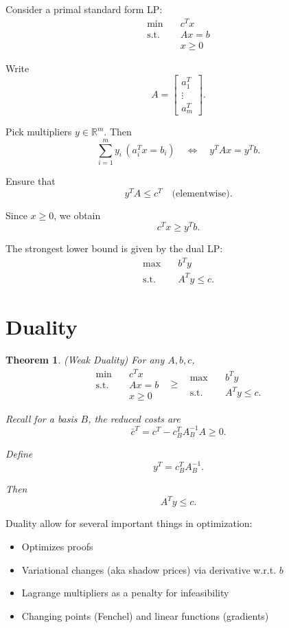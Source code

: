 \documentclass[12pt,oneside]{book}
\numberwithin{equation}{section}
\theoremstyle{definition}
\theoremstyle{plain}
\newtheorem{theorem}{Theorem}[section]
\theoremstyle{remark}
\begin{document}
Consider a primal standard form LP:
\[
\begin{aligned}
\min \quad & c^T x \\
\text{s.t.} \quad & Ax = b \\
& x \ge 0
\end{aligned}
\]

Write
\[
A =
\begin{bmatrix}
a_1^T \\
\vdots \\
a_m^T
\end{bmatrix}.
\]

Pick multipliers $y \in \mathbb{R}^m$. Then
\[
\sum_{i=1}^m y_i \,(a_i^T x = b_i)
\quad \Longleftrightarrow \quad
y^T A x = y^T b.
\]

Ensure that
\[
y^T A \le c^T \quad \text{(elementwise)}.
\]

Since $x \ge 0$, we obtain
\[
c^T x \ge y^T b.
\]

The strongest lower bound is given by the dual LP:
\[
\begin{aligned}
\max \quad & b^T y \\
\text{s.t.} \quad & A^T y \le c.
\end{aligned}
\]

\section{Duality}

\begin{theorem} (Weak Duality) For any $A,b,c$,
\[
\begin{aligned}
\min \quad & c^T x \\
\text{s.t.} \quad & Ax = b \\
& x \ge 0
\end{aligned}
\;\;\ge\;\;
\begin{aligned}
\max \quad & b^T y \\
\text{s.t.} \quad & A^T y \le c.
\end{aligned}
\]

Recall for a basis $B$, the reduced costs are
\[
\bar{c}^T = c^T - c_B^T A_B^{-1} A \ge 0.
\]

Define
\[
y^T = c_B^T A_B^{-1}.
\]

Then
\[
A^T y \le c.
\]
\end{theorem}

Duality allow for several important things in optimization:
\begin{itemize}
    \item Optimizes proofs
    \item Variational changes (aka shadow prices) via derivative w.r.t. $b$
    \item Lagrange multipliers as a penalty for infeasibility
    \item Changing points (Fenchel) and linear functions (gradients)
\end{itemize}
\end{document}
